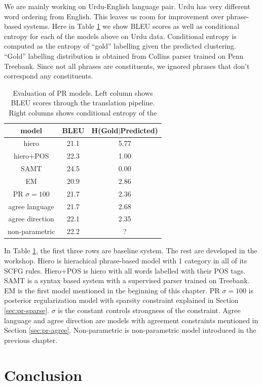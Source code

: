 We are mainly working on Urdu-English language pair. 
Urdu has very 
different word ordering from English. 
This leaves us room for improvement over
phrase-based systems.
Here in Table \ref{tab:results} 
we show BLEU scores as well as
conditional entropy for each of the models above
on Urdu data. Conditional entropy is computed
as the entropy of ``gold'' labelling given
the predicted clustering. ``Gold'' labelling
distribution
is obtained from Collins parser
trained on Penn Treebank. Since not
all phrases are constituents, we ignored
phrases that don't correspond any constituents.

\begin{table}[h]
  \centering
  \begin{tabular}{ |*{3}{c|} }
    \hline
    model & BLEU & H(Gold$|$Predicted)\\
    \hline
    hiero & 21.1 & 5.77\\
    hiero+POS & 22.3 & 1.00 \\
    SAMT & 24.5 & 0.00 \\
    \hline
    EM & 20.9 & 2.86 \\
    PR $\sigma=100$ & 21.7 & 2.36 \\
    agree language & 21.7 & 2.68 \\
    agree direction & 22.1 & 2.35\\
    non-parametric & 22.2 & ?\\
    \hline
  \end{tabular}
    \caption
  {Evaluation of PR models.
	Left column shows BLEU scores
	through the translation pipeline.
	Right columns shows conditional entropy
	of the 
    }
  \label{tab:results}
\end{table}

In Table \ref{tab:results}, the first three rows
are baseline system. The rest are developed in the workshop.
Hiero is hierachical phrase-based
model with 1 category in all of its SCFG rules. Hiero+POS
is hiero with all words labelled with their POS tags.
SAMT is a syntax based system with a supervised
parser trained on Treebank. EM is the first model mentioned
in the beginning of this chapter. PR $\sigma=100$ is 
posterior regularization model with sparsity constraint
explained in Section \ref{sec:pr-sparse}.
$\sigma$ is the constant controls strongness of the constraint.
Agree language and agree direction are models with agreement 
constraints mentioned in Section \ref{sec:pr-agree}. Non-parametric
is non-parametric model introduced in the previous chapter.
\section{Conclusion}
